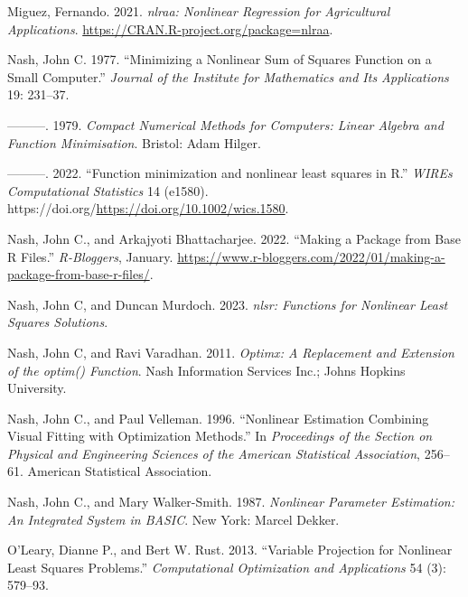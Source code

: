 \begin{CSLReferences}{1}{0}
\leavevmode{}%
Miguez, Fernando. 2021. \emph{{nlraa: Nonlinear Regression for Agricultural Applications}}. \url{https://CRAN.R-project.org/package=nlraa}.

\leavevmode{}%
Nash, John C. 1977. {``Minimizing a Nonlinear Sum of Squares Function on a Small Computer.''} \emph{Journal of the Institute for Mathematics and Its Applications} 19: 231--37.

\leavevmode{}%
---------. 1979. \emph{Compact Numerical Methods for Computers: Linear Algebra and Function Minimisation}. Bristol: Adam Hilger.

\leavevmode{}%
---------. 2022. {``{Function minimization and nonlinear least squares in R}.''} \emph{WIREs Computational Statistics} 14 (e1580). https://doi.org/\url{https://doi.org/10.1002/wics.1580}.

\leavevmode{}%
Nash, John C., and Arkajyoti Bhattacharjee. 2022. {``Making a Package from Base {R} Files.''} \emph{R-Bloggers}, January. \url{https://www.r-bloggers.com/2022/01/making-a-package-from-base-r-files/}.

\leavevmode{}%
Nash, John C, and Duncan Murdoch. 2023. \emph{{nlsr: Functions for Nonlinear Least Squares Solutions}}.

\leavevmode{}%
Nash, John C, and Ravi Varadhan. 2011. \emph{\emph{Optimx}: A Replacement and Extension of the {optim()} Function}. Nash Information Services Inc.; Johns Hopkins University.

\leavevmode{}%
Nash, John C., and Paul Velleman. 1996. {``Nonlinear Estimation Combining Visual Fitting with Optimization Methods.''} In \emph{Proceedings of the Section on Physical and Engineering Sciences of the American Statistical Association}, 256--61. American Statistical Association.

\leavevmode{}%
Nash, John C., and Mary Walker-Smith. 1987. \emph{{Nonlinear Parameter Estimation: An Integrated System in BASIC}}. New York: Marcel Dekker.

\leavevmode{}%
O'Leary, Dianne P., and Bert W. Rust. 2013. {``Variable Projection for Nonlinear Least Squares Problems.''} \emph{Computational Optimization and Applications} 54 (3): 579--93.


\end{CSLReferences}
